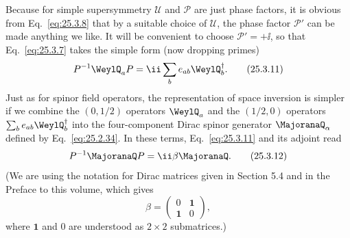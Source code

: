 Because for simple supersymmetry \(\mathcal U\) and \(\mathcal P\) are just
phase factors, it is obvious from Eq.~\eqref{eq:25.3.8} that by a suitable
choice of \(\mathcal U\), the phase factor \(\mathcal P'\) can be made
anything we like. It will be convenient to choose \(\mathcal P'=+\ii\), so
that Eq.~\eqref{eq:25.3.7} takes the simple form (now dropping primes)
\begin{equation}
P^{-1}\WeylQ_aP
=\ii\sum_b e_{ab}\WeylQ_b^\dagger.
\tag{25.3.11}\label{eq:25.3.11}
\end{equation}
Just as for spinor field operators, the representation of space inversion is
simpler if we combine the \((0,1/2)\) operators \(\WeylQ_a\) and the
\((1/2,0)\) operators \(\sum_b e_{ab}\WeylQ_b^\dagger\) into the
four-component Dirac spinor generator \(\MajoranaQ_\alpha\) defined by
Eq.~\eqref{eq:25.2.34}. In these terms, Eq.~\eqref{eq:25.3.11} and its
adjoint read
\begin{equation}
P^{-1}\MajoranaQ P=\ii\beta\MajoranaQ.
\tag{25.3.12}\label{eq:25.3.12}
\end{equation}
(We are using the notation for Dirac matrices given in Section 5.4 and in the
Preface to this volume, which gives
\[
\beta=
\begin{pmatrix}
0&\mathbf{1}\\
\mathbf{1}&0
\end{pmatrix},
\]
where \(\mathbf{1}\) and \(0\) are understood as \(2\times2\) submatrices.)


